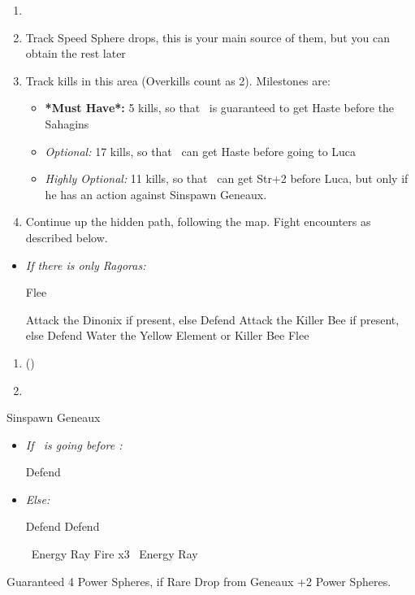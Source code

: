 \begin{enumerate}[resume]
    \item \formation{\tidus}{\wakka}{\lulu}
    \item Track Speed Sphere drops, this is your main source of them, but you can obtain the rest later
    \item Track kills in this area (Overkills count as 2). Milestones are:
    \begin{itemize}
        \item \textbf{*Must Have*:} 5 kills, so that \tidus\ is guaranteed to get Haste before the Sahagins
        \item \textit{Optional:} 17 kills, so that \tidus\ can get Haste before going to Luca
        \item \textit{Highly Optional:} 11 kills, so that \wakka\ can get Str+2 before Luca, but only if he has an action against Sinspawn Geneaux.
    \end{itemize}
    \item Continue up the hidden path, following the map. Fight encounters as described below.
\end{enumerate}
\begin{encounters}
    \begin{itemize}
        \item \textit{If there is only Ragoras:}
        \begin{itemize}
            \tidusf Flee
        \end{itemize}
        \tidusf Attack the Dinonix if present, else Defend
        \wakkaf Attack the Killer Bee if present, else Defend
        \luluf Water the Yellow Element or Killer Bee
        \tidusf Flee
    \end{itemize}
\end{encounters}
\begin{enumerate}[resume]
    \item \formation{\tidus}{\yuna}{\lulu} (\swap{\yuna}{\wakka})
    \item \save
\end{enumerate}
\begin{battle}[3000]{Sinspawn Geneaux}
    \begin{itemize}
        \item \textit{If \tidus\ is going before \yuna:}
        \begin{itemize}
            \tidusf Defend
        \end{itemize}
        \item \textit{Else:}
        \begin{itemize}
            \switch{\yuna}{\wakka}
            \wakkaf Defend
            \tidusf Defend
            \switch{\lulu}{\yuna}
        \end{itemize}
        \summon{\valefor}
        \valeforf \od\ Energy Ray
        \valeforf Fire x3
        \valeforf \od\ Energy Ray
    \end{itemize}
    Guaranteed 4 Power Spheres, if Rare Drop from Geneaux +2 Power Spheres.
\end{battle}
